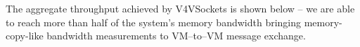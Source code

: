 \documentclass[a0paper,portrait,final]{baposter}
\begin{document}
\begin{poster}
{\begin{multicols}{2}
The aggregate throughput achieved by V4VSockets is shown below -- we are able to reach more than half of the system's memory bandwidth%
bringing memory-copy-like bandwidth measurements to VM--to--VM message exchange.

\end{multicols}

}

\end{poster}
\end{document}

